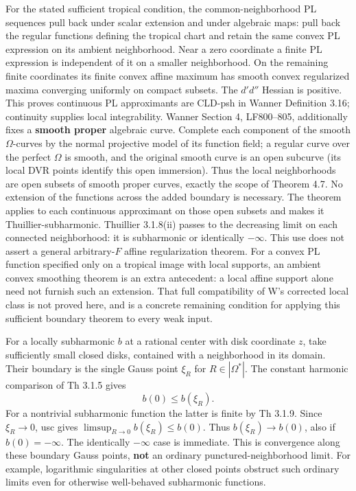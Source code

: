 \documentclass[
  10pt,
]{article}
\begin{document}
For the stated sufficient tropical condition, the common-neighborhood PL
sequences pull back under scalar extension and under algebraic maps:
pull back the regular functions defining the tropical chart and retain
the same convex PL expression on its ambient neighborhood. Near a zero
coordinate a finite PL expression is independent of it on a smaller
neighborhood. On the remaining finite coordinates its finite convex
affine maximum has smooth convex regularized maxima converging uniformly
on compact subsets. The \(d'd''\) Hessian is positive. This proves
continuous PL approximants are CLD-psh in Wanner Definition 3.16;
continuity supplies local integrability. Wanner Section 4, LF800--805,
additionally fixes a \textbf{smooth proper} algebraic curve. Complete
each component of the smooth \(\Omega\)-curves by the normal projective
model of its function field; a regular curve over the perfect \(\Omega\)
is smooth, and the original smooth curve is an open subcurve (its local
DVR points identify this open immersion). Thus the local neighborhoods
are open subsets of smooth proper curves, exactly the scope of Theorem
4.7. No extension of the functions across the added boundary is
necessary. The theorem applies to each continuous approximant on those
open subsets and makes it Thuillier-subharmonic. Thuillier 3.1.8(ii)
passes to the decreasing limit on each connected neighborhood: it is
subharmonic or identically \(-\infty\). This use does not assert a
general arbitrary-\(F\) affine regularization theorem. For a convex PL
function specified only on a tropical image with local supports, an
ambient convex smoothing theorem is an extra antecedent: a local affine
support alone need not furnish such an extension. That full
compatibility of W's corrected local class is not proved here, and is a
concrete remaining condition for applying this sufficient boundary
theorem to every weak input.

For a locally subharmonic \(b\) at a rational center with disk
coordinate \(z\), take sufficiently small closed disks, contained with a
neighborhood in its domain. Their boundary is the single Gauss point
\(\xi_R\) for \(R\in|\Omega^*|\). The constant harmonic comparison of Th
3.1.5 gives \[b(0)\le b(\xi_R).\] For a nontrivial subharmonic function
the latter is finite by Th 3.1.9. Since \(\xi_R\to0\), usc gives
\(\limsup_{R\to0}b(\xi_R)\le b(0)\). Thus \(b(\xi_R)\to b(0)\), also if
\(b(0)=-\infty\). The identically \(-\infty\) case is immediate. This is
convergence along these boundary Gauss points, \textbf{not} an ordinary
punctured-neighborhood limit. For example, logarithmic singularities at
other closed points obstruct such ordinary limits even for otherwise
well-behaved subharmonic functions.
\end{document}
